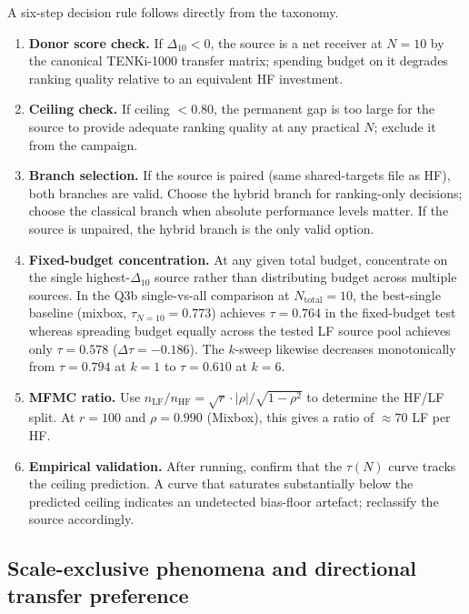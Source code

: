 \documentclass[twoside,twocolumn,9pt]{article}
\begin{document}
A six-step decision rule follows directly from the taxonomy.

\begin{enumerate}
\item \textbf{Donor score check.} If $\Delta_{10} < 0$, the source is a net receiver at $N=10$ by the canonical TENKi-1000 transfer matrix; spending budget on it degrades ranking quality relative to an equivalent HF investment.
\item \textbf{Ceiling check.} If ceiling $< 0.80$, the permanent gap is too large for the source to provide adequate ranking quality at any practical $N$; exclude it from the campaign.
\item \textbf{Branch selection.} If the source is paired (same shared-targets file as HF), both branches are valid. Choose the hybrid branch for ranking-only decisions; choose the classical branch when absolute performance levels matter. If the source is unpaired, the hybrid branch is the only valid option.
\item \textbf{Fixed-budget concentration.} At any given total budget, concentrate on the single highest-$\Delta_{10}$ source rather than distributing budget across multiple sources. In the Q3b single-vs-all comparison at $N_\mathrm{total} = 10$, the best-single baseline (mixbox, $\tau_{N=10} = 0.773$) achieves $\tau = 0.764$ in the fixed-budget test whereas spreading budget equally across the tested LF source pool achieves only $\tau = 0.578$ ($\Delta\tau = -0.186$). The $k$-sweep likewise decreases monotonically from $\tau = 0.794$ at $k=1$ to $\tau = 0.610$ at $k=6$.
\item \textbf{MFMC ratio.} Use $n_\mathrm{LF}/n_\mathrm{HF} = \sqrt{r} \cdot |\rho|/\sqrt{1-\rho^2}$ to determine the HF/LF split. At $r=100$ and $\rho = 0.990$ (Mixbox), this gives a ratio of $\approx 70$ LF per HF.
\item \textbf{Empirical validation.} After running, confirm that the $\tau(N)$ curve tracks the ceiling prediction. A curve that saturates substantially below the predicted ceiling indicates an undetected bias-floor artefact; reclassify the source accordingly.
\end{enumerate}

\subsection{Scale-exclusive phenomena and directional transfer preference}
\end{document}
